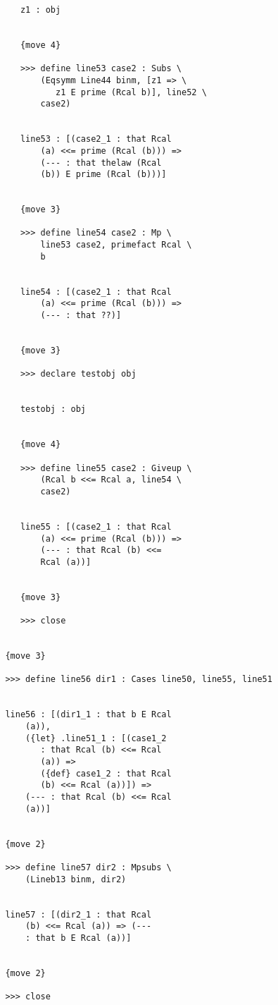 \documentclass[12pt]{article}
\begin{document}
\begin{verbatim}
            z1 : obj


            {move 4}

            >>> define line53 case2 : Subs \
                (Eqsymm Line44 binm, [z1 => \
                   z1 E prime (Rcal b)], line52 \
                case2)


            line53 : [(case2_1 : that Rcal 
                (a) <<= prime (Rcal (b))) => 
                (--- : that thelaw (Rcal 
                (b)) E prime (Rcal (b)))]


            {move 3}

            >>> define line54 case2 : Mp \
                line53 case2, primefact Rcal \
                b


            line54 : [(case2_1 : that Rcal 
                (a) <<= prime (Rcal (b))) => 
                (--- : that ??)]


            {move 3}

            >>> declare testobj obj


            testobj : obj


            {move 4}

            >>> define line55 case2 : Giveup \
                (Rcal b <<= Rcal a, line54 \
                case2)


            line55 : [(case2_1 : that Rcal 
                (a) <<= prime (Rcal (b))) => 
                (--- : that Rcal (b) <<= 
                Rcal (a))]


            {move 3}

            >>> close


         {move 3}

         >>> define line56 dir1 : Cases line50, line55, line51


         line56 : [(dir1_1 : that b E Rcal 
             (a)), 
             ({let} .line51_1 : [(case1_2 
                : that Rcal (b) <<= Rcal 
                (a)) => 
                ({def} case1_2 : that Rcal 
                (b) <<= Rcal (a))]) => 
             (--- : that Rcal (b) <<= Rcal 
             (a))]


         {move 2}

         >>> define line57 dir2 : Mpsubs \
             (Lineb13 binm, dir2)


         line57 : [(dir2_1 : that Rcal 
             (b) <<= Rcal (a)) => (--- 
             : that b E Rcal (a))]


         {move 2}

         >>> close



\end{verbatim}
\end{document}
